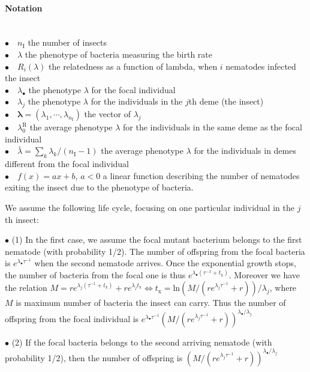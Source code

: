 \documentclass{article}
\newcommand{\nI}{{n_\textrm{I}}}
\begin{document}
  \paragraph{Notation} $ $\\
 $\bullet \quad \nI$ the number of insects \\
 $\bullet \quad \lambda$ the phenotype of bacteria measuring the birth rate\\
  $\bullet \quad R_{i}(\lambda)$ the relatedness as a function of lambda, when $i$ nematodes infected the insect \\
 $\bullet \quad \lambda_\bullet $ the phenotype $\lambda$ for the focal individual\\
 $\bullet \quad \lambda_j$ the phenotype $\lambda$ for the individuals in the $j$th deme (the insect)\\
 $\bullet \quad \mathbf{\lambda}=(\lambda_1,\cdots,\lambda_{\nI})$ the vector of $\lambda_j$\\
 $\bullet \quad \lambda_0^{\mathrm{R}}$ the average phenotype $\lambda$ for the individuals in the same deme as the focal individual\\
 $\bullet \quad \bar{\lambda}=\sum_k \lambda_k / (\nI -1) $ the average phenotype $\lambda$ for the individuals in demes different from the focal individual\\
 $\bullet \quad f (x)=ax+b$, $a<0$ a linear function describing the number of nematodes exiting the insect due to the phenotype of bacteria.
 
We assume the following life cycle, focusing on one particular individual in the $j$th insect:


 $ \bullet$ (1) In the first case, we assume the focal mutant bacterium belongs to the first nematode (with probability 1/2). The number of offspring from the focal bacteria is $e^{\lambda_\bullet \tau^{-1}}$ when the second nematode arrives. Once the exponential growth stops, the number of 
 bacteria from the focal one is thus $e^{\lambda_\bullet(\tau^{-1}+ t_\mathrm{x})}$. Moreover we have the relation $M=re^{\lambda_j(\tau^{-1}+ t_\mathrm{x})}+re^{\lambda_j t_\mathrm{x}} \iff t_\mathrm{x} = \mathrm{ln}(M/(re^{\lambda_j\tau^{-1}}+r))/ \lambda_j$, where $M$ is maximum number of bacteria the insect can carry. Thus the number of offspring from the focal individual is $e^{\lambda_\bullet\tau^{-1}} (M/(re^{\lambda_j\tau^{-1}}+r))^{\lambda_\bullet / \lambda_j}$
 
 $ \bullet$ (2) If the focal bacteria belongs to the second arriving nematode (with probability 1/2), then the number of offspring is $ (M/(re^{\lambda_j\tau^{-1}}+r))^{\lambda_\bullet / \lambda_j}$
 
\end{document}
